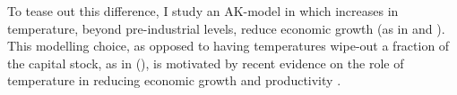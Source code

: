 \documentclass[../../main.tex]{subfiles}
\begin{document}
To tease out this difference, I study an AK-model in which increases in temperature, beyond pre-industrial levels, reduce economic growth (as in \cite{pindyck_economic_2013} and \cite{hambel_optimal_2021}). This modelling choice, as opposed to having temperatures wipe-out a fraction of the capital stock, as in \citeauthor{nordhaus_estimates_2014} (\citeyear{nordhaus_estimates_2014,nordhaus_revisiting_2017}), is motivated by recent evidence on the role of temperature in reducing economic growth and productivity \citep{burke_global_2015, dietz_growth_2019}.

\fi
\end{document}

